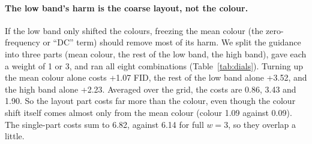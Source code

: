 \documentclass[11pt]{article}
\begin{document}
\paragraph{The low band's harm is the coarse layout, not the colour.} If the low band only shifted the colours,
freezing the mean colour (the zero-frequency or ``DC'' term) should remove most of its harm. We split the guidance
into three parts (mean colour, the rest of the low band, the high band), gave each a weight of 1 or 3, and ran all
eight combinations (Table~\ref{tab:dials}). Turning up the mean colour alone costs +1.07 FID, the rest of the low band
alone +3.52, and the high band alone +2.23. Averaged over the grid, the costs are 0.86, 3.43 and 1.90. So the layout
part costs far more than the colour, even though the colour shift itself comes almost only from the mean colour
(colour 1.09 against 0.09). The single-part costs sum to 6.82, against 6.14 for full $w = 3$, so they overlap a little.
\end{document}

